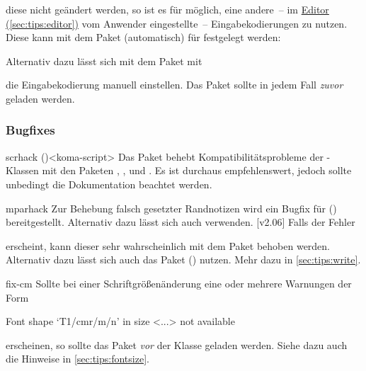 \begin{packages}
  diese nicht geändert werden, so ist es für  möglich, eine 
  andere~-- im \hyperref[sec:tips:editor]{Editor (\autoref{sec:tips:editor})} 
  vom Anwender eingestellte~-- Eingabekodierungen zu nutzen. Diese kann mit dem 
  Paket  (automatisch) für  festgelegt werden:
  \begin{Code}
    \usepackage{selinput}
  \end{Code}\vspace{-\baselineskip}%
  Alternativ dazu lässt sich mit dem Paket  mit
  \vspace{-\baselineskip}%
  die Eingabekodierung manuell einstellen. Das Paket  sollte 
  in jedem Fall \emph{zuvor} geladen werden.
\end{packages}



\subsubsection{Bugfixes}
\begin{packages}
\item[scrhack]()<koma-script>
  Das Paket behebt Kompatibilitätsprobleme der \KOMAScript-Klassen mit den 
  Paketen , ,  und
  . Es ist durchaus empfehlenswert, jedoch sollte unbedingt 
  die Dokumentation beachtet werden.
\item[mparhack]
  Zur Behebung falsch gesetzter Randnotizen wird ein Bugfix für 
  () bereitgestellt. Alternativ dazu 
  lässt sich auch  verwenden.
  [v2.06]
  Falls der Fehler 
  \vspace{-\baselineskip}
  erscheint, kann dieser sehr wahrscheinlich mit dem Paket  
  behoben werden. Alternativ dazu lässt sich auch das Paket 
  () nutzen. Mehr dazu in 
  \autoref{sec:tips:write}.
\item[fix-cm]
  Sollte bei einer Schriftgrößenänderung eine oder mehrere Warnungen der Form
  \begin{Code}
    Font shape `T1/cmr/m/n' in size <...> not available
  \end{Code}\vspace{-\baselineskip}%
  erscheinen, so sollte das Paket  \emph{vor} der Klasse 
  geladen werden. Siehe dazu auch die Hinweise in \autoref{sec:tips:fontsize}.
\end{packages}
